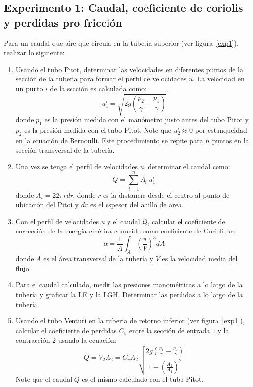 \documentclass[10pt, a4paper]{exam}
\begin{document}
\subsection{Experimento 1: Caudal, coeficiente de coriolis y perdidas pro fricci\'on}
Para un caudal que aire que circula en la tuber\'ia superior (ver figura~\ref{exp1}), realizar lo siguiente: 
\begin{enumerate}
    \item Usando el tubo Pitot, determinar las velocidades en diferentes puntos de la secci\'on de la tuber\'ia para formar el perfil de velocidades $u$. La velocidad en un punto $i$ de la secci\'on es calculada como:
    $$
    u_1^i = \sqrt{2g \left( \frac{p_2}{\gamma}-\frac{p_1}{\gamma}\right)}
    $$
    donde $p_1$ es la presi\'on medida con el man\'ometro justo antes del tubo Pitot y $p_2$ es la presi\'on medida con el tubo Pitot. Note que $u_2^i \approx 0$ por estanqueidad en la ecuaci\'on de Bernoulli. Este procedimiento se repite para $n$ puntos en la secci\'on transversal de la tuber\'ia.
    \item Una vez se tenga el perfil de velocidades $u$, determinar el caudal como:
    $$
    Q = \sum_{i=1}^n A_i\ u_1^i
    $$
    donde $A_i=2 2\pi r dr$, donde $r$ es la distancia desde el centro al punto de ubicaci\'on del Pitot y $dr$ es el espesor del anillo de area.
    \item Con el perfil de velocidades $u$ y el caudal $Q$, calcular el coeficiente de correcci\'on de la energ\'ia cin\'etica conocido como coeficiente de Coriolis $\alpha$:
    $$
    \alpha = \frac{1}{A} \int_A \left( \frac{u}{V}\right)^3 dA
    $$
    donde $A$ es el \'area transversal de la tuber\'ia y $V$ es la velocidad media del flujo.
    \item Para el caudal calculado, medir las presiones manom\'etricas a lo largo de la tuber\'ia y graficar la LE y la LGH. Determinar las perdidas a lo largo de la tuber\'ia.
    \item Usando el tubo Venturi en la tuberia de retorno inferior (ver figura~\ref{exp1}), calcular el coeficiente de perdidas $C_v$ entre la secci\'on de entrada $1$ y la contracci\'on $2$ usando la ecuaci\'on:
    $$
    Q=V_2 A_2 = C_v A_2 \sqrt{\frac{2g\left(\frac{p_1}{\gamma}-\frac{p_2}{\gamma}\right)}{1-\left(\frac{A_2}{A_1}\right)^2}}
    $$
    Note que el caudal $Q$ es el mismo calculado con el tubo Pitot.
\end{enumerate}
\end{document}
